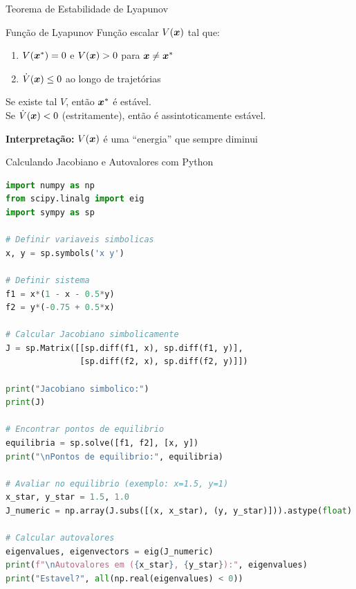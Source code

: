 \begin{frame}[allowframebreaks]{Teorema de Estabilidade de Lyapunov}

\vspace{0.3cm}

\begin{block}{Função de Lyapunov}
Função escalar $V(\boldsymbol{x})$ tal que:
\begin{enumerate}
    \item $V(\boldsymbol{x}^*) = 0$ e $V(\boldsymbol{x}) > 0$ para $\boldsymbol{x} \neq \boldsymbol{x}^*$
    \item $\dot{V}(\boldsymbol{x}) \leq 0$ ao longo de trajetórias
\end{enumerate}
Se existe tal $V$, então $\boldsymbol{x}^*$ é estável.\\
Se $\dot{V}(\boldsymbol{x}) < 0$ (estritamente), então é assintoticamente estável.
\end{block}

\vspace{0.3cm}

\textbf{Interpretação:} $V(\boldsymbol{x})$ é uma ``energia'' que sempre diminui
\end{frame}

\begin{frame}{Calculando Jacobiano e Autovalores com Python}
\begin{lstlisting}[language=Python, basicstyle=\ttfamily\footnotesize]
import numpy as np
from scipy.linalg import eig
import sympy as sp

# Definir variaveis simbolicas
x, y = sp.symbols('x y')

# Definir sistema
f1 = x*(1 - x - 0.5*y)
f2 = y*(-0.75 + 0.5*x)

# Calcular Jacobiano simbolicamente
J = sp.Matrix([[sp.diff(f1, x), sp.diff(f1, y)],
               [sp.diff(f2, x), sp.diff(f2, y)]])

print("Jacobiano simbolico:")
print(J)

# Encontrar pontos de equilibrio
equilibria = sp.solve([f1, f2], [x, y])
print("\nPontos de equilibrio:", equilibria)

# Avaliar no equilibrio (exemplo: x=1.5, y=1)
x_star, y_star = 1.5, 1.0
J_numeric = np.array(J.subs([(x, x_star), (y, y_star)])).astype(float)

# Calcular autovalores
eigenvalues, eigenvectors = eig(J_numeric)
print(f"\nAutovalores em ({x_star}, {y_star}):", eigenvalues)
print("Estavel?", all(np.real(eigenvalues) < 0))
\end{lstlisting}
\end{frame}

